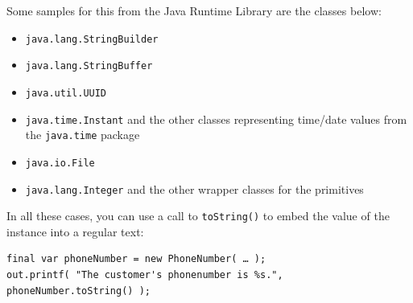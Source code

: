 \documentclass[11pt,a4paper, titlepage, parskip=half, headsepline, footsepline, cleardoublepage=current, headheight=1cm]{scrbook}
\begin{document}
Some samples for this from the Java Runtime Library are the classes below:
\begin{itemize}
\item\lstinline|java.lang.StringBuilder|\autocite{ORACLE_DOC_STRINGBUILDER_CLASS}
\item\lstinline|java.lang.StringBuffer|\autocite{ORACLE_DOC_STRINGBUFFER_CLASS}
\item\lstinline|java.util.UUID|\autocite{ORACLE_DOC_UUID_CLASS}
\item\lstinline|java.time.Instant|\autocite{ORACLE_DOC_INSTANT_CLASS} and the other classes representing time/date values from the \lstinline|java.time| package\autocite{ORACLE_DOC_TIME_PACKAGE}
\item\lstinline|java.io.File|\autocite{ORACLE_DOC_FILE_CLASS}
\item\lstinline|java.lang.Integer|\autocite{ORACLE_DOC_INTEGER_CLASS} and the other wrapper classes for the primitives
\end{itemize}

In all these cases, you can use a call to \lstinline|toString()| to embed the value of the instance into a regular text:
\begin{lstlisting}
final var phoneNumber = new PhoneNumber( … );
out.printf( "The customer's phonenumber is %s.", phoneNumber.toString() );
\end{lstlisting}
\end{document}
